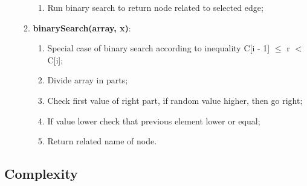 \begin{itemize}
\begin{enumerate}
\begin{enumerate}
			\item  Run binary search  to return node related to selected edge;
			\end{enumerate}
		\item  \textbf{binarySearch(array, x)}:
			\begin{enumerate}
			\item  Special case of binary search according to inequality C[i - 1] $\leq$ r $<$ C[i];
			\item  Divide array in parts;
			\item  Check first value of right part, if random value higher, then go right;
			\item  If value lower check that previous element lower or equal;
			\item  Return related name of node.
			\end{enumerate}
	\end{enumerate}

\end{itemize}



\subsection{Complexity}



\pagebreak